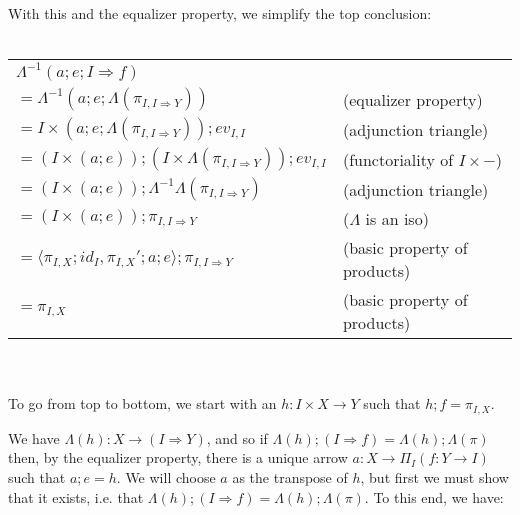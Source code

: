 \documentclass{article}
\begin{document}
With this and the equalizer property, we simplify the top conclusion:\\~\\
\begin{tabular}{ll}
$\Lambda^{-1}(a;e;I \Rightarrow f)$ & \\
$= \Lambda^{-1}(a;e;\Lambda(\pi_{I,I \Rightarrow Y}))$ & (equalizer property) \\
$= I \times (a;e;\Lambda(\pi_{I,I \Rightarrow Y}));\mathit{ev}_{I,I}$ & (adjunction triangle) \\
$= (I \times (a;e));(I \times \Lambda(\pi_{I,I \Rightarrow Y}));\mathit{ev}_{I,I}$ & (functoriality of $I \times -$) \\
$= (I \times (a;e));\Lambda^{-1}\Lambda(\pi_{I,I \Rightarrow Y})$ & (adjunction triangle) \\
$= (I \times (a;e));\pi_{I,I \Rightarrow Y}$ & ($\Lambda$ is an iso)  \\
$= \langle \pi_{I,X};\mathit{id}_I, \pi_{I,X}';a;e \rangle;\pi_{I,I \Rightarrow Y}$ & (basic property of products) \\
$= \pi_{I,X}$ & (basic property of products)
 
\end{tabular}\\~\\
To go from top to bottom, we start with an $h : I \times X \to Y$ such that $h;f = \pi_{I,X}$.

We have $\Lambda(h) : X \to (I \Rightarrow Y)$, and so if $\Lambda(h);(I \Rightarrow f) = \Lambda(h);\Lambda(\pi)$ 
then, by the equalizer property, there is a unique arrow $a : X \to \Pi_I(f : Y \to I)$ such that $a;e=h$.
We will choose $a$ as the transpose of $h$, but first we must show that it exists, i.e. that 
$\Lambda(h);(I \Rightarrow f) = \Lambda(h);\Lambda(\pi)$. To this end, we have:
\end{document}
